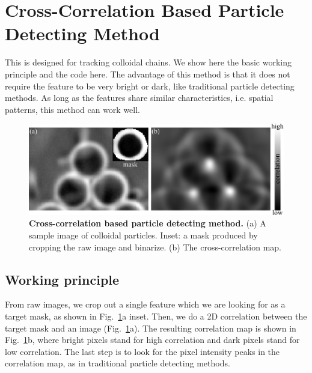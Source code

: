 \section{Cross-Correlation Based Particle Detecting Method}
\label{sec:A-cross-correlation-tracking-method}
This is designed for tracking colloidal chains. We show here the basic working principle and the code here. The advantage of this method is that it does not require the feature to be very bright or dark, like traditional particle detecting methods. As long as the features share similar characteristics, i.e. spatial patterns, this method can work well.

\begin{figure}[h]
	\begin{center}
	\includegraphics[width=5.5in]{Figs/A-2/corrTrack.pdf}
	\end{center}
	\caption[Cross-correlation based particle detecting method]
	{
	\textbf{Cross-correlation based particle detecting method.}
  (a) A sample image of colloidal particles. Inset: a mask produced by cropping the raw image and binarize.
  (b) The cross-correlation map.
	}
	\label{fig:corr-track}
\end{figure}

\subsection{Working principle}
From raw images, we crop out a single feature which we are looking for as a target mask, as shown in Fig.~\ref{fig:corr-track}a inset. Then, we do a 2D correlation between the target mask and an image (Fig.~\ref{fig:corr-track}a). The resulting correlation map is shown in Fig.~\ref{fig:corr-track}b, where bright pixels stand for high correlation and dark pixels stand for low correlation. The last step is to look for the pixel intensity peaks in the correlation map, as in traditional particle detecting methods.



